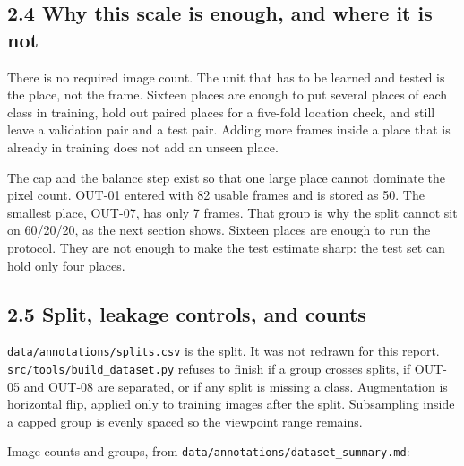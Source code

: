 \documentclass[11pt,a4paper]{article}
\begin{document}
\subsection{2.4 Why this scale is enough, and where it is not}\label{why-this-scale-is-enough-and-where-it-is-not}

There is no required image count. The unit that has to be learned and tested is the place, not the frame. Sixteen places are enough to put several places of each class in training, hold out paired places for a five-fold location check, and still leave a validation pair and a test pair. Adding more frames inside a place that is already in training does not add an unseen place.

The cap and the balance step exist so that one large place cannot dominate the pixel count. OUT-01 entered with 82 usable frames and is stored as 50. The smallest place, OUT-07, has only 7 frames. That group is why the split cannot sit on 60/20/20, as the next section shows. Sixteen places are enough to run the protocol. They are not enough to make the test estimate sharp: the test set can hold only four places.

\subsection{2.5 Split, leakage controls, and counts}\label{split-leakage-controls-and-counts}

\texttt{data/\allowbreak{}annotations/\allowbreak{}splits.csv} is the split. It was not redrawn for this report. \texttt{src/\allowbreak{}tools/\allowbreak{}build\_\allowbreak{}dataset.py} refuses to finish if a group crosses splits, if OUT-05 and OUT-08 are separated, or if any split is missing a class. Augmentation is horizontal flip, applied only to training images after the split. Subsampling inside a capped group is evenly spaced so the viewpoint range remains.

Image counts and groups, from \texttt{data/\allowbreak{}annotations/\allowbreak{}dataset\_\allowbreak{}summary.md}:
\end{document}
